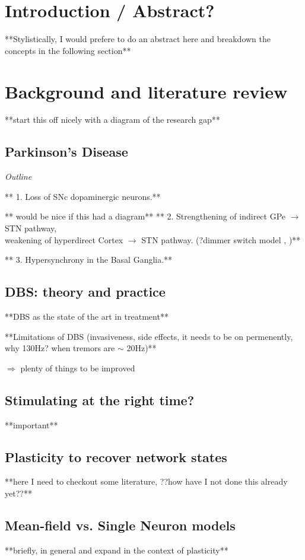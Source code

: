 \section{Introduction / Abstract?}
**Stylistically, I would prefere to do an abstract here and breakdown the concepts in the following section**
\section{Background and literature review}
**start this off nicely with a diagram of the research gap**

\subsection{Parkinson's Disease}
\textit{Outline}

** 1. Loss of SNc dopaminergic neurons.**

** would be nice if this had a diagram**
** 2. Strengthening of indirect GPe $\rightarrow$ STN pathway, \\
weakening of hyperdirect Cortex $\rightarrow$ STN pathway.
(?dimmer switch model \cite{helmich2012cerebral}, \cite{west2022stimulating})**

** 3. Hypersynchrony in the Basal Ganglia.**

\subsection{DBS: theory and practice}
**DBS as the state of the art in treatment**

**Limitations of DBS (invasiveness, side effects, it needs to be on permenently,
why 130Hz? when tremors are $\sim$ 20Hz)**

$\Rightarrow$ plenty of things to be improved

\subsection{Stimulating at the right time?}
**important** \cite{cagnan2017stimulating} \cite{west2022stimulating}

\subsection{Plasticity to recover network states}
**here I need to checkout some literature, ??how have I not done this already yet??**

\subsection{Mean-field vs. Single Neuron models}
**briefly, in general and expand in the context of plasticity**

